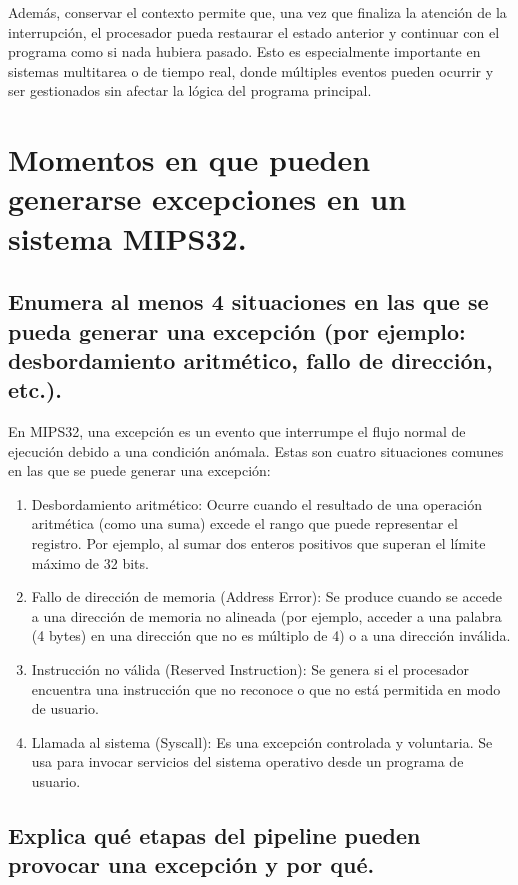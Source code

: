 \documentclass{article}
\begin{document}
Además, conservar el contexto permite que, una vez que finaliza la atención de la interrupción, el procesador pueda restaurar el estado anterior y continuar con el programa como si nada hubiera pasado. Esto es especialmente importante en sistemas multitarea o de tiempo real, donde múltiples eventos pueden ocurrir y ser gestionados sin afectar la lógica del programa principal.

\section{Momentos en que pueden generarse excepciones en un sistema MIPS32.}

\subsection{Enumera al menos 4 situaciones en las que se pueda generar una excepción (por ejemplo: desbordamiento aritmético, fallo de dirección, etc.).}

En MIPS32, una excepción es un evento que interrumpe el flujo normal de ejecución debido a una condición anómala. Estas son cuatro situaciones comunes en las que se puede generar una excepción:

\begin{enumerate}
\item Desbordamiento aritmético: Ocurre cuando el resultado de una operación aritmética (como una suma) excede el rango que puede representar el registro. Por ejemplo, al sumar dos enteros positivos que superan el límite máximo de 32 bits.
\item Fallo de dirección de memoria (Address Error): Se produce cuando se accede a una dirección de memoria no alineada (por ejemplo, acceder a una palabra (4 bytes) en una dirección que no es múltiplo de 4) o a una dirección inválida.
\item Instrucción no válida (Reserved Instruction): Se genera si el procesador encuentra una instrucción que no reconoce o que no está permitida en modo de usuario.
\item Llamada al sistema (Syscall): Es una excepción controlada y voluntaria. Se usa para invocar servicios del sistema operativo desde un programa de usuario.
\end{enumerate}

\subsection{Explica qué etapas del pipeline pueden provocar una excepción y por qué.}
\end{document}

